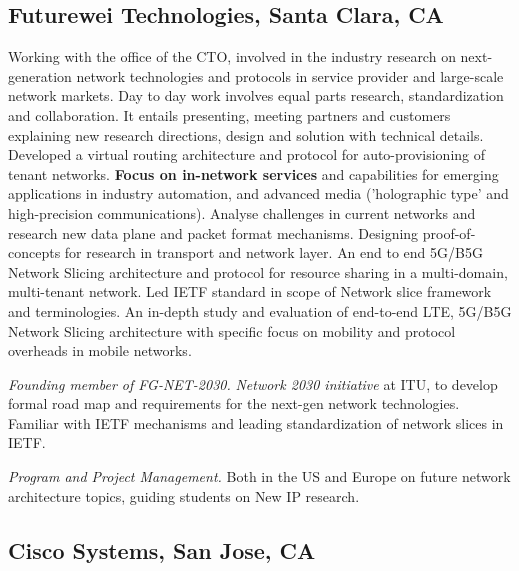 \documentclass[11pt,a4paper,sans]{moderncv} %
\begin{document}
\subsection{Futurewei Technologies, Santa Clara, CA}
{Working with the office of the CTO, involved in the industry research on next-generation network technologies and protocols in service provider and large-scale network markets. Day to day work involves equal parts research, standardization and collaboration. It entails presenting, meeting partners and customers explaining new research directions, design and solution with technical details.\\
}
{Developed a virtual routing architecture and protocol for auto-provisioning of tenant networks. 
}
{\textbf{Focus on in-network services} and capabilities for emerging applications in industry automation, and advanced media ('holographic type' and high-precision communications). Analyse challenges in current networks and research new data plane and packet format mechanisms. Designing proof-of-concepts for research in transport and network layer. 
}
{An end to end 5G/B5G Network Slicing architecture and  protocol for resource sharing in a multi-domain, multi-tenant network. Led IETF standard in scope of Network slice framework and terminologies.
} 
{An in-depth study and evaluation of end-to-end LTE, 5G/B5G Network Slicing architecture with specific focus on mobility and protocol overheads in mobile networks.
} 

 {\textit{Founding member of FG-NET-2030.}}{}{}{}
 {\emph{Network 2030 initiative} at ITU, to develop formal road map and requirements for the next-gen network technologies. Familiar with IETF mechanisms and leading standardization of network slices in IETF.
 }

 {\textit{Program and Project Management.}}{}{}{}
{Both in the US and Europe on future network architecture topics, guiding students on New IP research.
}

\subsection{Cisco Systems, San Jose, CA}
\end{document}
